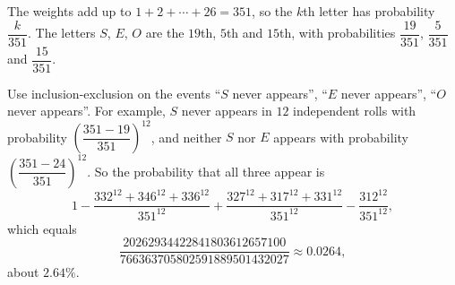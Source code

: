 The weights add up to $1+2+\cdots+26=351$, so the $k$th letter has probability $\dfrac{k}{351}$. The letters $S$, $E$, $O$ are the $19$th, $5$th and $15$th, with probabilities $\dfrac{19}{351}$, $\dfrac{5}{351}$ and $\dfrac{15}{351}$.

Use inclusion-exclusion on the events ``$S$ never appears'', ``$E$ never appears'', ``$O$ never appears''. For example, $S$ never appears in $12$ independent rolls with probability $\left(\dfrac{351-19}{351}\right)^{12}$, and neither $S$ nor $E$ appears with probability $\left(\dfrac{351-24}{351}\right)^{12}$. So the probability that all three appear is
\[1-\dfrac{332^{12}+346^{12}+336^{12}}{351^{12}}+\dfrac{327^{12}+317^{12}+331^{12}}{351^{12}}-\dfrac{312^{12}}{351^{12}},\]
which equals
\[\boxed{\dfrac{20262934422841803612657100}{766363705802591889501432027}}\approx0.0264,\]
about $2.64\%$.
